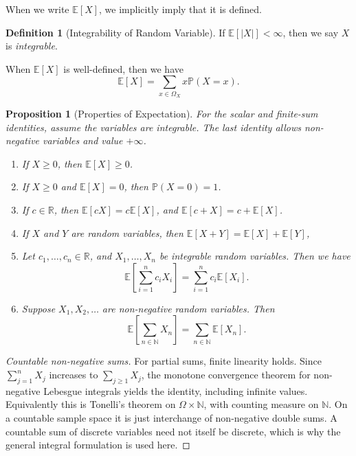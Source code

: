 \documentclass[11pt]{article}
\numberwithin{equation}{section}
\newtheorem{proposition}[theorem]{Proposition}
\theoremstyle{definition}
\newtheorem{definition}[theorem]{Definition}
\theoremstyle{remark}
\newcommand{\pqty}[1]{\left(#1\right)}
\newcommand{\bqty}[1]{\left[#1\right]}
\newcommand{\abs}[1]{\left|#1\right|}
\newcommand{\RR}{\mathbb R}
\newcommand{\NN}{\mathbb N}
\newcommand{\Prob}{\mathbb P}
\newcommand{\Expt}{\mathbb E}
\begin{document}
When we write \(\Expt\bqty{X}\), we implicitly imply that it is defined.

\begin{definition}[Integrability of Random Variable]\label{probability-definition-025}
    \label{probability-def:integrability-random-variable}%
    If \(\Expt\bqty{\abs{X}} < \infty\), then we say \(X\) is \emph{integrable}.
\end{definition}

When \(\Expt\bqty{X}\) is well-defined, then we have
\[
    \Expt\bqty{X} = \sum_{x \in \Omega_X} x \Prob\pqty{X = x}.
\]

\begin{proposition}[Properties of Expectation]\label{probability-proposition-007}
    \label{probability-prop:properties-expectation}%
For the scalar and finite-sum identities, assume the variables are integrable. The last identity allows non-negative variables and value \(+\infty\).
    \begin{enumerate}
        \item If \(X \geq 0\), then \(\Expt\bqty{X} \geq 0\).
        \item If \(X \geq 0\) and \(\Expt\bqty{X} = 0 \), then \(\Prob\pqty{X = 0} = 1\).
        \item If \(c \in \RR\), then \(\Expt\bqty{cX} = c \Expt\bqty{X}\), and \(\Expt\bqty{c + X} = c + \Expt\bqty{X}\).
        \item If \(X\) and \(Y\) are random variables, then \(\Expt\bqty{X + Y} = \Expt\bqty{X} + \Expt\bqty{Y}\),
        \item Let \(c_1, \ldots, c_n \in \RR\), and \(X_1, \ldots, X_n\) be integrable random variables. Then we have
        \[
            \Expt \bqty{\sum_{i = 1}^{n} c_i X_i} = \sum_{i = 1}^{n} c_i \Expt \bqty{X_i}.
        \]
        \item Suppose \(X_1, X_2, \ldots\) are non-negative random variables. Then
        \[
            \Expt\bqty{\sum_{n \in \NN} X_n} = \sum_{n \in \NN} \Expt\bqty{X_n}.
        \]
    \end{enumerate}
\end{proposition}

\begin{proof}[Countable non-negative sums]\label{probability-proof-017}
For partial sums, finite linearity holds. Since \(\sum_{j=1}^nX_j\)
increases to \(\sum_{j\ge1}X_j\), the monotone convergence theorem for
non-negative Lebesgue integrals yields the identity, including infinite values.
Equivalently this is Tonelli's theorem on \(\Omega\times\NN\), with counting
measure on \(\NN\). On a countable sample space it is just interchange of
non-negative double sums. A countable sum of discrete variables need not itself
be discrete, which is why the general integral formulation is used here.
\end{proof}
\end{document}
